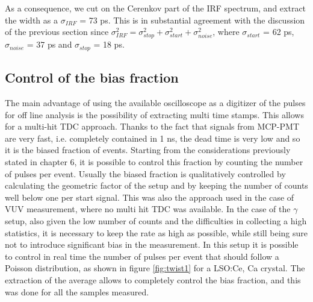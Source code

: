 As a consequence, we cut on the Cerenkov part of the IRF spectrum, and extract the width as a $\sigma _{IRF}$ = 73 ps. This is in substantial agreement with the discussion of the previous section since $\sigma _{IRF}^{2} = \sigma _{stop}^{2} + \sigma _{start}^{2} + \sigma _{noise}^{2}$, where $\sigma _{start}$ = 62 ps, $\sigma _{noise}$ = 37 ps and $\sigma _{stop}$ = 18 ps.

\subsection{Control of the bias fraction}
The main advantage of using the available oscilloscope as a digitizer of the pulses for off line analysis is the possibility of extracting multi time stamps. This allows for a multi-hit TDC approach. 
Thanks to the fact that signals from MCP-PMT are very fast, i.e. completely contained in 1 ns, the dead time is very low and so it is the biased fraction of events. 
Starting from the considerations previously stated in chapter 6, it is possible to control this fraction by counting the number of pulses per event.
Usually the biased fraction is qualitatively controlled by calculating the geometric factor of the setup and by keeping the number of counts well below one per start signal. This was also the approach used in the case of VUV measurement, where  no multi hit TDC was available.
In the case of the $\gamma$ setup, also given the low number of counts and the difficulties in collecting a high statistics, it is necessary to keep the rate as high as possible, while still being sure not to introduce significant bias in the measurement.
In this setup it is possible to control in real time the number of pulses per event that should follow a Poisson distribution, as shown in figure \ref{fig:twist1} for a LSO:Ce, Ca crystal. The extraction of the average allows to completely control the bias fraction, and this was done for all the samples measured.
